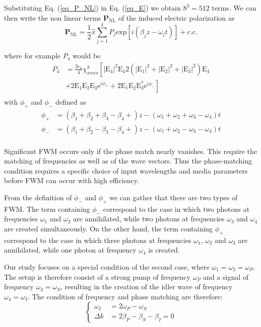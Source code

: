 \documentclass[12pt,a4paper,twoside]{article}
\begin{document}
Substituting Eq. (\ref{eq_P_NL}) in Eq. (\ref{eq_E}) we obtain $8^3=512$ terms.
We can then write the non linear terms $\mathrm{\textbf{P}_{NL}}$ of the induced electric polarization as
\begin{equation}
	\mathrm{\textbf{P}_{NL}} = \frac{1}{2}\hat{x} \sum_{j=1}^4 P_j \mathrm{exp}[i(\beta_j z - \omega_j t)] + c.c.
	\label{eq_P}
\end{equation}

where for example $P_4$ would be
\[
\begin{array}{rl}
	P_4 &= \frac{3\varepsilon_0}{4} \chi^3_{xxxx}\left[ |\mathrm{E}_4|^2\mathrm{E}_4 2(|\mathrm{E}_1|^2+|\mathrm{E}_2|^2+|\mathrm{E}_3|^2)\mathrm{E}_4 \right. \\
	&+ \left. 2\mathrm{E}_1\mathrm{E}_2\mathrm{E}_3\mathrm{e}^{i\phi_+}+2\mathrm{E}_1\mathrm{E}_2\mathrm{E}_3^*\mathrm{e}^{i\phi_-}\right] \\

\end{array}
\]
\hspace{18pt}with $\phi_+$ and $\phi_-$ defined as
\[
\begin{array}{lr}
\phi_+ &= (\beta_1+\beta_2+\beta_3-\beta_4+)z - (\omega_1+\omega_2+\omega_3-\omega_4)t \\
\phi_- &= (\beta_1+\beta_2-\beta_3-\beta_4+)z - (\omega_1+\omega_2-\omega_3-\omega_4)t \\
\end{array}
\]

Significant FWM occurs only if the phase match nearly vanishes.
This require the matching of frequencies as well as of the wave vectors.
Thus the phase-matching condition requires a specific choice of input wavelengths and media parameters before FWM can occur with high efficiency.

From the definition of $\phi_-$ and $\phi_+$ we can gather that there are two types of FWM.
The term containing $\phi_-$ correspond to the case in which two photons at frequencies $\omega_1$ and $\omega_2$ are annihilated, while two photons at frequencies $\omega_3$ and $\omega_4$ are created simultaneously.
On the other hand, the term containing $\phi_+$ correspond to the case in which three photons at frequencies $\omega_1$, $\omega_2$ and $\omega_3$ are annihilated, while one photon at frequency $\omega_4$ is created.

Our study focuses on a special condition of the second case, where $\omega_1 = \omega_2 = \omega_P$. The setup is therefore consist of a strong pump of frequency  $\omega_P$ and a signal of frequency  $\omega_3 = \omega_S$, resulting in the creation of the idler wave of frequency $\omega_4 = \omega_I$.
The condition of frequency and phase matching are therefore:
\begin{equation}
\left\{
 	\begin{aligned}
		\omega_I &= 2\omega_P - \omega_S \\
		\Delta k &= 2\beta_P - \beta_S - \beta_I = 0
	\end{aligned}
\right.
\label{eq_f&pmc}
\end{equation} %
\end{document}
